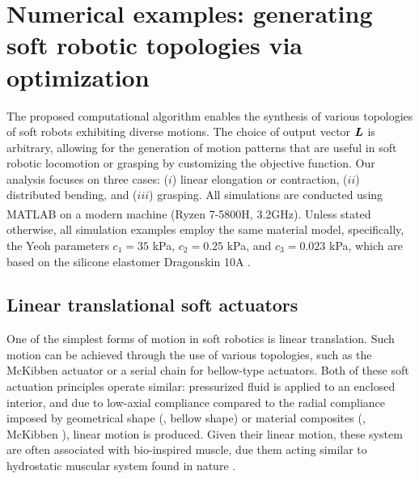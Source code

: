 \section[Numerical examples: generating soft robotic topologies]{Numerical examples: generating soft robotic topologies via optimization}
\label{sec:C1:results}
The proposed computational algorithm enables the synthesis of various topologies of soft robots exhibiting diverse motions. The choice of output vector ${\boldsymbol{L}}$ is arbitrary, allowing for the generation of motion patterns that are useful in soft robotic locomotion or grasping by customizing the objective function. Our analysis focuses on three cases: ($i$) linear elongation or contraction, ($ii$) distributed bending, and ($iii$) grasping. All simulations are conducted using MATLAB\textsuperscript{\scriptsize\textregistered} on a modern machine (Ryzen 7-5800H, 3.2GHz). Unless stated otherwise, all simulation examples employ the same material model, specifically, the Yeoh parameters $c_1 = 35$ kPa, $c_2 = 0.25$ kPa, and $c_3 = 0.023$ kPa, which are based on the silicone elastomer Dragonskin 10A \cite{Xavier2022Jun}.

\subsection{Linear translational soft actuators}
One of the simplest forms of motion in soft robotics is linear translation. Such motion can be achieved through the use of various topologies, such as the McKibben actuator or a serial chain for bellow-type actuators. Both of these soft actuation principles operate similar: pressurized fluid is applied to an enclosed interior, and due to low-axial compliance compared to the radial compliance imposed by geometrical shape (\eg, bellow shape) or material composites (\eg, McKibben \cite{Paynter1974,Paynter1988}), linear motion is produced.  Given their linear motion, these system are often associated with bio-inspired muscle, due them acting similar to hydrostatic muscular system found in nature \cite{Kier1985}. 
 
